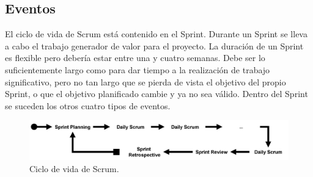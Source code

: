 \subsection{Eventos}

El ciclo de vida de Scrum está contenido en el Sprint. Durante un Sprint se lleva a cabo el trabajo generador de valor para el proyecto. La duración de un Sprint es flexible pero debería estar entre una y cuatro semanas. Debe ser lo suficientemente largo como para dar tiempo a la realización de trabajo significativo, pero no tan largo que se pierda de vista el objetivo del propio Sprint, o que el objetivo planificado cambie y ya no sea válido. Dentro del Sprint se suceden los otros cuatro tipos de eventos.

\begin{figure}[hp!]
    \centering
    \includegraphics[width=1.0\textwidth]{imaxes/d-metodologia/ciclo-scrum.png}
    \caption{Ciclo de vida de Scrum.}
    \label{fig:ciclo-vida-scrum}
\end{figure}

